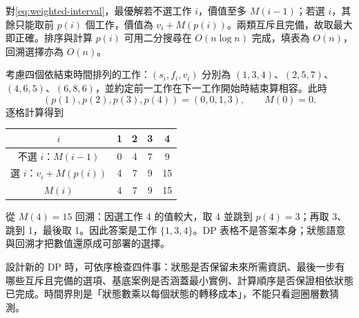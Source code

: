 \documentclass[11pt,a4paper,oneside,openany]{book}
\begin{document}
對\cref{eq:weighted-interval}，最優解若不選工作 $i$，價值至多 $M(i-1)$；若選 $i$，其餘只能取前 $p(i)$ 個工作，價值為 $v_i+M(p(i))$。兩類互斥且完備，故取最大即正確。排序與計算 $p(i)$ 可用二分搜尋在 $O(n\log n)$ 完成，填表為 $O(n)$，回溯選擇亦為 $O(n)$。

\begin{example}[從狀態定義到回溯答案]
考慮四個依結束時間排列的工作：$(s_i,f_i,v_i)$ 分別為 $(1,3,4)$、$(2,5,7)$、$(4,6,5)$、$(6,8,6)$，並約定前一工作在下一工作開始時結束算相容。此時
\[
 (p(1),p(2),p(3),p(4))=(0,0,1,3),\qquad M(0)=0.
\]
逐格計算得到
\begin{center}
\begin{tabular}{@{}ccccc@{}}
\toprule
$i$ & 1 & 2 & 3 & 4 \\
\midrule
不選 $i$：$M(i-1)$ & 0 & 4 & 7 & 9 \\
選 $i$：$v_i+M(p(i))$ & 4 & 7 & 9 & 15 \\
$M(i)$ & 4 & 7 & 9 & 15 \\
\bottomrule
\end{tabular}
\end{center}
從 $M(4)=15$ 回溯：因選工作 4 的值較大，取 4 並跳到 $p(4)=3$；再取 3、跳到 1，最後取 1。因此答案是工作 $\{1,3,4\}$。DP 表格不是答案本身；狀態語意與回溯才把數值還原成可部署的選擇。
\end{example}

設計新的 DP 時，可依序檢查四件事：狀態是否保留未來所需資訊、最後一步有哪些互斥且完備的選項、基底案例是否涵蓋最小實例、計算順序是否保證相依狀態已完成。時間界則是「狀態數乘以每個狀態的轉移成本」，不能只看迴圈層數猜測。
\end{document}
